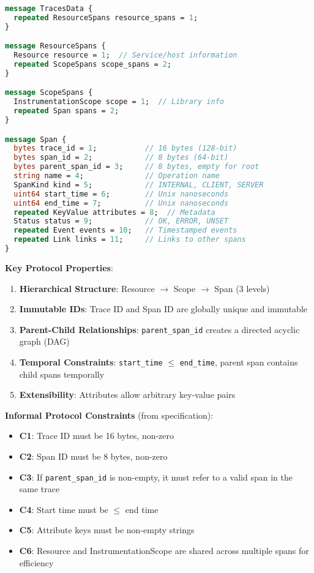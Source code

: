 \begin{lstlisting}[style=otlpcode,language=protobuf,caption={OTLP Trace Data Model (Protocol Buffers)}]
message TracesData {
  repeated ResourceSpans resource_spans = 1;
}

message ResourceSpans {
  Resource resource = 1;  // Service/host information
  repeated ScopeSpans scope_spans = 2;
}

message ScopeSpans {
  InstrumentationScope scope = 1;  // Library info
  repeated Span spans = 2;
}

message Span {
  bytes trace_id = 1;           // 16 bytes (128-bit)
  bytes span_id = 2;            // 8 bytes (64-bit)
  bytes parent_span_id = 3;     // 8 bytes, empty for root
  string name = 4;              // Operation name
  SpanKind kind = 5;            // INTERNAL, CLIENT, SERVER
  uint64 start_time = 6;        // Unix nanoseconds
  uint64 end_time = 7;          // Unix nanoseconds
  repeated KeyValue attributes = 8;  // Metadata
  Status status = 9;            // OK, ERROR, UNSET
  repeated Event events = 10;   // Timestamped events
  repeated Link links = 11;     // Links to other spans
}
\end{lstlisting}

\textbf{Key Protocol Properties}:

\begin{enumerate}
\item \textbf{Hierarchical Structure}: Resource $\rightarrow$ Scope $\rightarrow$ Span (3 levels)
\item \textbf{Immutable IDs}: Trace ID and Span ID are globally unique and immutable
\item \textbf{Parent-Child Relationships}: \texttt{parent\_span\_id} creates a directed acyclic graph (DAG)
\item \textbf{Temporal Constraints}: \texttt{start\_time} $\leq$ \texttt{end\_time}, parent span contains child spans temporally
\item \textbf{Extensibility}: Attributes allow arbitrary key-value pairs
\end{enumerate}

\textbf{Informal Protocol Constraints} (from specification):

\begin{itemize}
\item \textbf{C1}: Trace ID must be 16 bytes, non-zero
\item \textbf{C2}: Span ID must be 8 bytes, non-zero
\item \textbf{C3}: If \texttt{parent\_span\_id} is non-empty, it must refer to a valid span in the same trace
\item \textbf{C4}: Start time must be $\leq$ end time
\item \textbf{C5}: Attribute keys must be non-empty strings
\item \textbf{C6}: Resource and InstrumentationScope are shared across multiple spans for efficiency
\end{itemize}

